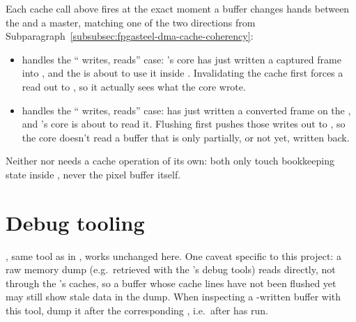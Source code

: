 Each cache call above fires at the exact moment a buffer changes hands between the  and a  master, matching one of the two directions from Subparagraph~\ref{subsubsec:fpgasteel-dma-cache-coherency}:

\begin{itemize}
    \item {} handles the `` writes,  reads'' case: 's  core has just written a captured frame into , and the  is about to use it inside . Invalidating the cache first forces a read out to , so it actually sees what the  core wrote.
    \item {} handles the `` writes,  reads'' case:  has just written a converted  frame on the , and 's  core is about to read it. Flushing first pushes those  writes out to , so the  core doesn't read a buffer that is only partially, or not yet, written back.
\end{itemize}

Neither  nor  needs a cache operation of its own: both only touch bookkeeping state inside , never the pixel buffer itself.

\section{Debug tooling}
\label{sec:fpgasteel-cache-forwarding-debug-tooling}

, same tool as in , works unchanged here. One caveat specific to this project: a raw memory dump (e.g.\ retrieved with the  's debug tools) reads  directly, not through the 's caches, so a buffer whose cache lines have not been flushed yet may still show stale data in the dump. When inspecting a -written buffer with this tool, dump it after the corresponding , i.e.\ after  has run.